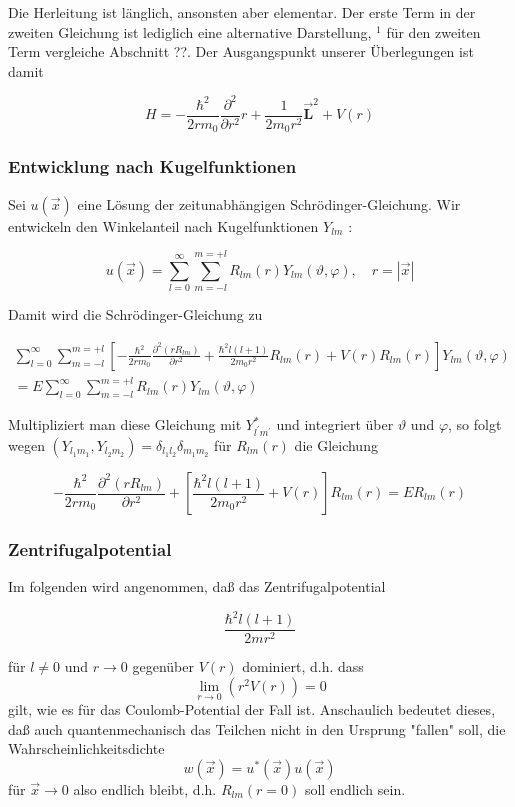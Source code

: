 \documentclass[10pt, letterpaper]{article}
\begin{document}
Die Herleitung ist länglich, ansonsten aber elementar. Der erste Term in der zweiten Gleichung ist lediglich eine alternative Darstellung, ${ }^{1}$ für den zweiten Term vergleiche Abschnitt ??. Der Ausgangspunkt unserer Überlegungen ist damit

$$
H=-\frac{\hbar^{2}}{2 r m_{0}} \frac{\partial^{2}}{\partial r^{2}} r+\frac{1}{2 m_{0} r^{2}} \overrightarrow{\mathbf{L}}^{2}+V(r)
$$

\subsubsection*{Entwicklung nach Kugelfunktionen}
Sei $u(\vec{x})$ eine Lösung der zeitunabhängigen Schrödinger-Gleichung. Wir entwickeln den Winkelanteil nach Kugelfunktionen $Y_{l m}$ :

$$
u(\vec{x})=\sum_{l=0}^{\infty} \sum_{m=-l}^{m=+l} R_{l m}(r) Y_{l m}(\vartheta, \varphi), \quad r=|\vec{x}|
$$

Damit wird die Schrödinger-Gleichung zu

$$
\begin{array}{r}
\sum_{l=0}^{\infty} \sum_{m=-l}^{m=+l}\left[-\frac{\hbar^{2}}{2 r m_{0}} \frac{\partial^{2}\left(r R_{l m}\right)}{\partial r^{2}}+\frac{\hbar^{2} l(l+1)}{2 m_{0} r^{2}} R_{l m}(r)+V(r) R_{l m}(r)\right] Y_{l m}(\vartheta, \varphi) \\
=E \sum_{l=0}^{\infty} \sum_{m=-l}^{m=+l} R_{l m}(r) Y_{l m}(\vartheta, \varphi)
\end{array}
$$

Multipliziert man diese Gleichung mit $Y_{l^{\prime} m^{\prime}}^{*}$ und integriert über $\vartheta$ und $\varphi$, so folgt wegen $\left(Y_{l_{1} m_{1}}, Y_{l_{2} m_{2}}\right)=\delta_{l_{1} l_{2}} \delta_{m_{1} m_{2}}$ für $R_{l m}(r)$ die Gleichung

$$
-\frac{\hbar^{2}}{2 r m_{0}} \frac{\partial^{2}\left(r R_{l m}\right)}{\partial r^{2}}+\left[\frac{\hbar^{2} l(l+1)}{2 m_{0} r^{2}}+V(r)\right] R_{l m}(r)=E R_{l m}(r)
$$

\subsubsection*{Zentrifugalpotential}
Im folgenden wird angenommen, daß das Zentrifugalpotential

$$
\frac{\hbar^{2} l(l+1)}{2 m r^{2}}
$$

für $l \neq 0$ und $r \rightarrow 0$ gegenüber $V(r)$ dominiert, d.h. dass
$$
\lim _{r \rightarrow 0}\left(r^{2} V(r)\right)=0
$$
gilt, wie es für das Coulomb-Potential der Fall ist. Anschaulich bedeutet dieses, daß auch quantenmechanisch das Teilchen nicht in den Ursprung "fallen" soll, die Wahrscheinlichkeitsdichte
$$
w(\vec{x})=u^{*}(\vec{x}) u(\vec{x})
$$
für $\vec{x} \rightarrow 0$ also endlich bleibt, d.h. $R_{l m}(r=0)$ soll endlich sein.
\end{document}
